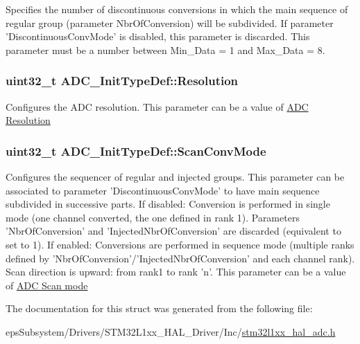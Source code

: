 Specifies the number of discontinuous conversions in which the main sequence of regular group (parameter Nbr\-Of\-Conversion) will be subdivided. If parameter 'Discontinuous\-Conv\-Mode' is disabled, this parameter is discarded. This parameter must be a number between Min\-\_\-\-Data = 1 and Max\-\_\-\-Data = 8. \hypertarget{struct_a_d_c___init_type_def_abebb8d3277cb9a5aae72578076762f5d}{
\subsubsection[{Resolution}]{\setlength{\rightskip}{0pt plus 5cm}uint32\-\_\-t A\-D\-C\-\_\-\-Init\-Type\-Def\-::\-Resolution}}\label{struct_a_d_c___init_type_def_abebb8d3277cb9a5aae72578076762f5d}
Configures the A\-D\-C resolution. This parameter can be a value of \hyperlink{group___a_d_c___resolution}{A\-D\-C Resolution} \hypertarget{struct_a_d_c___init_type_def_a47cd689a52562a2481059a5d8ed82788}{
\subsubsection[{Scan\-Conv\-Mode}]{\setlength{\rightskip}{0pt plus 5cm}uint32\-\_\-t A\-D\-C\-\_\-\-Init\-Type\-Def\-::\-Scan\-Conv\-Mode}}\label{struct_a_d_c___init_type_def_a47cd689a52562a2481059a5d8ed82788}
Configures the sequencer of regular and injected groups. This parameter can be associated to parameter 'Discontinuous\-Conv\-Mode' to have main sequence subdivided in successive parts. If disabled\-: Conversion is performed in single mode (one channel converted, the one defined in rank 1). Parameters 'Nbr\-Of\-Conversion' and 'Injected\-Nbr\-Of\-Conversion' are discarded (equivalent to set to 1). If enabled\-: Conversions are performed in sequence mode (multiple ranks defined by 'Nbr\-Of\-Conversion'/'Injected\-Nbr\-Of\-Conversion' and each channel rank). Scan direction is upward\-: from rank1 to rank 'n'. This parameter can be a value of \hyperlink{group___a_d_c___scan__mode}{A\-D\-C Scan mode} 

The documentation for this struct was generated from the following file\-:\begin{DoxyCompactItemize}
\item 
eps\-Subsystem/\-Drivers/\-S\-T\-M32\-L1xx\-\_\-\-H\-A\-L\-\_\-\-Driver/\-Inc/\hyperlink{stm32l1xx__hal__adc_8h}{stm32l1xx\-\_\-hal\-\_\-adc.\-h}\end{DoxyCompactItemize}
